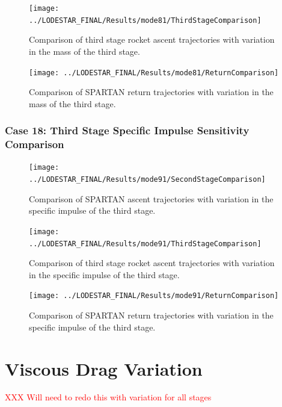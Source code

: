 \begin{figure}[!th]
\centering
\texttt{[image: ../LODESTAR\_FINAL/Results/mode81/ThirdStageComparison]}
\caption{Comparison of third stage rocket ascent trajectories with variation in the mass of the third stage.}
\label{fig:ThirdStageComparison14}
\end{figure}



\begin{figure}[!th]
	\centering
	\texttt{[image: ../LODESTAR\_FINAL/Results/mode81/ReturnComparison]}
	\caption{Comparison of SPARTAN return trajectories with variation in the mass of the third stage.}
	\label{fig:ReturnComparison14}
\end{figure}
\FloatBarrier
\clearpage
\subsection{Case 18: Third Stage Specific Impulse Sensitivity Comparison}\label{sec:app_comparison91}

\begin{figure}[!th]
\centering
\texttt{[image: ../LODESTAR\_FINAL/Results/mode91/SecondStageComparison]}
\caption{Comparison of SPARTAN ascent trajectories with variation in the specific impulse of the third stage.}
\label{fig:SecondStageComparison15}
\end{figure}


\begin{figure}[!th]
\centering
\texttt{[image: ../LODESTAR\_FINAL/Results/mode91/ThirdStageComparison]}
\caption{Comparison of third stage rocket ascent trajectories with variation in the specific impulse of the third stage.}
\label{fig:ThirdStageComparison15}
\end{figure}


\begin{figure}[!th]
\centering
\texttt{[image: ../LODESTAR\_FINAL/Results/mode91/ReturnComparison]}
\caption{Comparison of SPARTAN return trajectories with variation in the specific impulse of the third stage.}
\label{fig:ReturnComparison15}
\end{figure}


\chapter{Viscous Drag Variation}
\textcolor{red}{XXX Will need to redo this with variation for all stages}

